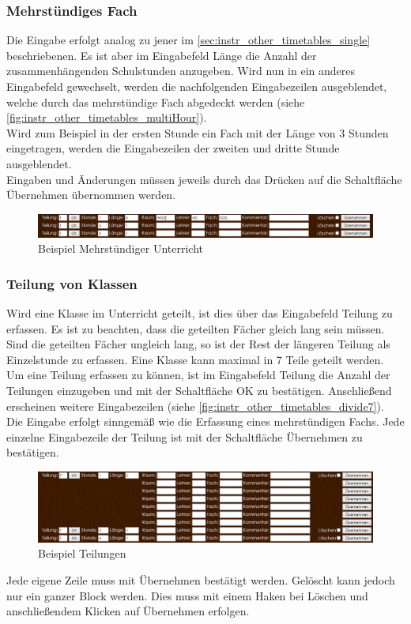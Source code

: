 \subsubsection{Mehrstündiges Fach}
Die Eingabe erfolgt analog zu jener im \autoref{sec:instr_other_timetables_single} beschriebenen. Es ist aber im Eingabefeld Länge die Anzahl der zusammenhängenden Schulstunden anzugeben. Wird nun in ein anderes Eingabefeld gewechselt, werden die nachfolgenden Eingabezeilen ausgeblendet, welche durch das mehrstündige Fach abgedeckt werden (siehe \autoref{fig:instr_other_timetables_multiHour}).\\
Wird zum Beispiel in der ersten Stunde ein Fach mit der Länge von 3 Stunden eingetragen, werden die Eingabezeilen der zweiten und dritte Stunde ausgeblendet.\\
Eingaben und Änderungen müssen jeweils durch das Drücken auf die Schaltfläche Übernehmen übernommen werden.
\begin{figure}[H]
\centering
\includegraphics[keepaspectratio=true, width=14cm]{images/screenshots/timetables_input_multiHour.png}
\caption{Beispiel Mehrstündiger Unterricht}
\label{fig:instr_other_timetables_multiHour}
\end{figure}
\subsubsection{Teilung von Klassen}
Wird eine Klasse im Unterricht geteilt, ist dies über das Eingabefeld Teilung zu erfassen. Es ist zu beachten, dass die geteilten Fächer gleich lang sein müssen. Sind die geteilten Fächer ungleich lang, so ist der Rest der längeren Teilung als Einzelstunde zu erfassen. Eine Klasse kann maximal in 7 Teile geteilt werden.\\
Um eine Teilung erfassen zu können, ist im Eingabefeld Teilung die Anzahl der Teilungen einzugeben und mit der Schaltfläche OK zu bestätigen. Anschließend erscheinen weitere Eingabezeilen (siehe \autoref{fig:instr_other_timetables_divide7}).\\
Die Eingabe erfolgt sinngemäß wie die Erfassung eines mehrstündigen Fachs. Jede einzelne Eingabezeile der Teilung ist mit der Schaltfläche Übernehmen zu bestätigen.
\begin{figure}[H]
\centering
\includegraphics[keepaspectratio=true, width=14cm]{images/screenshots/timetables_input_divide7.png}
\caption{Beispiel Teilungen}
\label{fig:instr_other_timetables_divide7}
\end{figure}
Jede eigene Zeile muss mit Übernehmen bestätigt werden. Gelöscht kann jedoch nur ein ganzer Block werden. Dies muss mit einem Haken bei Löschen und anschließendem Klicken auf Übernehmen erfolgen.
